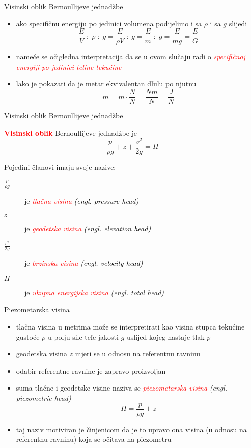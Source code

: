 \documentclass[croatian]{beamer}
\begin{document}
\begin{frame}{Visinski oblik Bernoullijeve jednadžbe}

\begin{itemize}
\item ako specifičnu energiju po jedinici volumena podijelimo i sa $\rho$
i sa $g$ slijedi
\[
\frac{E}{V}\;:\;\rho\;:\;g=\frac{E}{\rho V}\;:\;g=\frac{E}{m}\;:\;g=\frac{E}{mg}=\frac{E}{G}
\]
\item nameće se očigledna interpretacija da se u ovom slučaju radi o \textcolor{red}{\emph{specifičnoj
energiji po jedinici teľine tekućine}}
\item lako je pokazati da je metar ekvivalentan dľulu po njutnu
\[
m=m\cdot\frac{N}{N}=\frac{Nm}{N}=\frac{J}{N}
\]
\end{itemize}
\end{frame}

\begin{frame}{Visinski oblik Bernoullijeve jednadžbe}

\textbf{\textcolor{red}{Visinski oblik}} Bernoullijeve jednadžbe je
\[
\frac{p}{\rho g}+z+\frac{v^{2}}{2g}=H
\]
\begin{block}{Pojedini članovi imaju svoje nazive:}
\begin{description}
\item [{$\frac{p}{\rho g}$}] je\textcolor{red}{\emph{ tlačna visina }}\textcolor{black}{\emph{(engl.
pressure head)}}
\item [{$z$}] je \textcolor{red}{\emph{geodetska visina }}\textcolor{black}{\emph{(engl.
elevation head)}}
\item [{$\frac{v^{2}}{2g}$}] je \textcolor{red}{\emph{brzinska visina
}}\textcolor{black}{\emph{(engl. velocity head)}}
\item [{$H$}] je \textcolor{red}{\emph{ukupna energijska visina}} \emph{(engl.
total head)}
\end{description}
\end{block}
\end{frame}

\begin{frame}{Piezometarska visina}

\begin{itemize}
\item tlačna visina u metrima može se interpretirati kao visina stupca tekućine
gustoće $\rho$ u polju sile teľe jakosti $g$ uslijed kojeg nastaje
tlak $p$
\item geodetska visina $z$ mjeri se u odnosu na referentnu ravninu
\item odabir referentne ravnine je zapravo proizvoljan
\item suma tlačne i geodetske visine naziva se \textcolor{red}{\emph{piezometarska
visina }}\emph{(engl. piezometric head)}
\[
\Pi=\frac{p}{\rho g}+z
\]
\item taj naziv motiviran je činjenicom da je to upravo ona visina (u odnosu
na referentnu ravninu) koja se očitava na piezometru
\end{itemize}
\end{frame}
\end{document}
